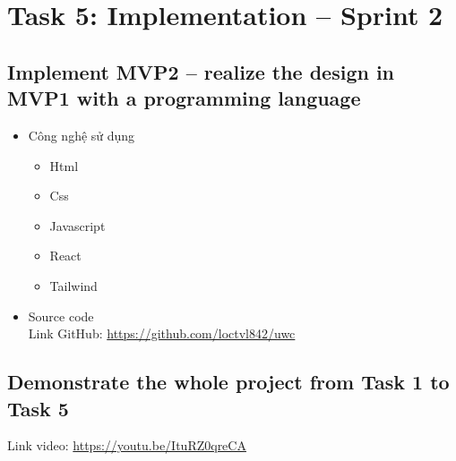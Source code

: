 \documentclass[a4paper]{article}
\begin{document}
\section{Task 5: Implementation – Sprint 2}
\subsection{Implement MVP2 – realize the design in MVP1 with a programming language}
\begin{itemize}
    \item Công nghệ sử dụng
    \begin{itemize}
        \item Html
        \item Css
        \item Javascript
        \item React
        \item Tailwind
    \end{itemize} 
    \item Source code\\
    Link GitHub: \url{https://github.com/loctvl842/uwc}
\end{itemize}

\subsection{Demonstrate the whole project from Task 1 to Task 5}
Link video: \url{https://youtu.be/ItuRZ0qreCA}
\end{document}
